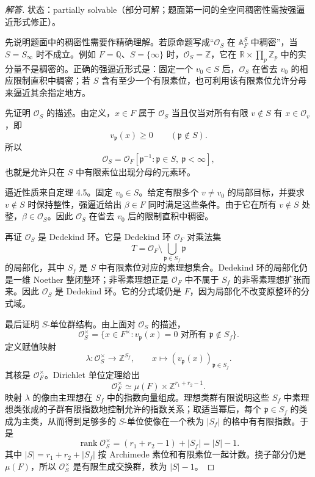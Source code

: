 \documentclass[11pt,a4paper,openany]{ctexbook}
\numberwithin{equation}{chapter}
\newcommand{\Q}{\mathbb{Q}}
\newcommand{\R}{\mathbb{R}}
\newcommand{\Z}{\mathbb{Z}}
\newcommand{\A}{\mathbb{A}}
\theoremstyle{plain}
\theoremstyle{definition}
\theoremstyle{remark}
\begin{document}
\begin{proof}[解答]
状态：partially solvable（部分可解；题面第一问的全空间稠密性需按强逼近形式修正）。

先说明题面中的稠密性需要作精确理解。若原命题写成“$\mathcal O_S$ 在 $\A_F^S$ 中稠密”，当 $S=S_\infty$ 时不成立。例如 $F=\Q$、$S=\{\infty\}$ 时，$\mathcal O_S=\Z$，它在 $\R\times\prod_p\Z_p$ 中的实分量不是稠密的。正确的强逼近形式是：固定一个 $v_0\in S$ 后，$\mathcal O_S$ 在省去 $v_0$ 的相应限制直积中稠密；若 $S$ 含有至少一个有限素位，也可利用该有限素位允许分母来逼近其余指定地方。

先证明 $\mathcal O_S$ 的描述。由定义，$x\in F$ 属于 $\mathcal O_S$ 当且仅当对所有有限 $v\notin S$ 有 $x\in\mathcal O_v$，即
\[
 v_\mathfrak p(x)\ge0\qquad(\mathfrak p\notin S).
\]
所以
\[
 \mathcal O_S=\mathcal O_F[\mathfrak p^{-1}:\mathfrak p\in S,\ \mathfrak p<\infty],
\]
也就是允许只在 $S$ 中有限素位出现分母的元素环。

逼近性质来自定理 4.5。固定 $v_0\in S$。给定有限多个 $v\ne v_0$ 的局部目标，并要求 $v\notin S$ 时保持整性，强逼近给出 $\beta\in F$ 同时满足这些条件。由于它在所有 $v\notin S$ 处整，$\beta\in\mathcal O_S$。因此 $\mathcal O_S$ 在省去 $v_0$ 后的限制直积中稠密。

再证 $\mathcal O_S$ 是 Dedekind 环。它是 Dedekind 环 $\mathcal O_F$ 对乘法集
\[
 T=\mathcal O_F\setminus\bigcup_{\mathfrak p\in S_f}\mathfrak p
\]
的局部化，其中 $S_f$ 是 $S$ 中有限素位对应的素理想集合。Dedekind 环的局部化仍是一维 Noether 整闭整环；非零素理想正是 $\mathcal O_F$ 中不属于 $S_f$ 的非零素理想扩张而来。因此 $\mathcal O_S$ 是 Dedekind 环。它的分式域仍是 $F$，因为局部化不改变原整环的分式域。

最后证明 $S$-单位群结构。由上面对 $\mathcal O_S$ 的描述，
\[
 \mathcal O_S^\times
 =\{x\in F^\times: v_\mathfrak p(x)=0\text{ 对所有 }\mathfrak p\notin S_f\}.
\]
定义赋值映射
\[
 \lambda:\mathcal O_S^\times\to\Z^{S_f},\qquad
 x\mapsto (v_\mathfrak p(x))_{\mathfrak p\in S_f}.
\]
其核是 $\mathcal O_F^\times$。Dirichlet 单位定理给出
\[
 \mathcal O_F^\times\simeq\mu(F)\times\Z^{r_1+r_2-1}.
\]
映射 $\lambda$ 的像由主理想在 $S_f$ 中的指数向量组成。理想类群有限说明这些 $S_f$ 中素理想类张成的子群有限指数地控制允许的指数关系；取适当幂后，每个 $\mathfrak p\in S_f$ 的类成为主类，从而得到足够多的 $S$-单位使像在一个秩为 $|S_f|$ 的格中有有限指数。于是
\[
 \operatorname{rank}\mathcal O_S^\times
 =(r_1+r_2-1)+|S_f|=|S|-1.
\]
其中 $|S|=r_1+r_2+|S_f|$ 按 Archimede 素位和有限素位一起计数。挠子部分仍是 $\mu(F)$，所以 $\mathcal O_S^\times$ 是有限生成交换群，秩为 $|S|-1$。
\end{proof}
\end{document}
